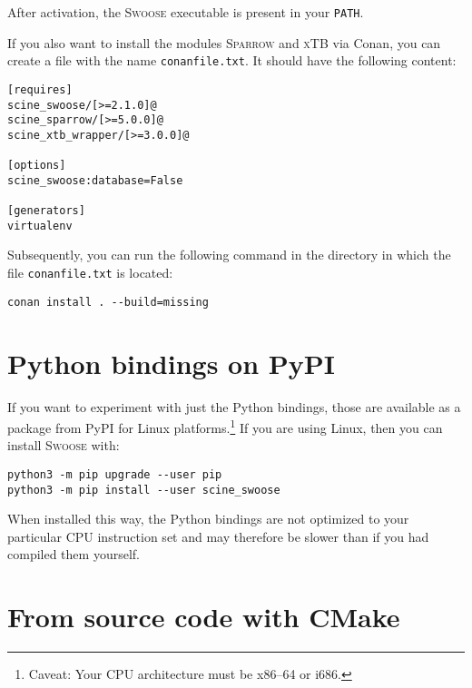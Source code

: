 \documentclass[]{tufte-book}
\begin{document}
After activation, the \textsc{Swoose} executable is present in your \texttt{PATH}.

If you also want to install the modules \textsc{Sparrow} and \textsc{xTB} via Conan, you can create a file with the name \texttt{conanfile.txt}. It should have the following content:

\begin{mdframed}[backgroundcolor=LightSteelBlue!25, linewidth=0pt]
\begin{verbatim}
[requires]
scine_swoose/[>=2.1.0]@
scine_sparrow/[>=5.0.0]@
scine_xtb_wrapper/[>=3.0.0]@

[options]
scine_swoose:database=False

[generators]
virtualenv
\end{verbatim}
\end{mdframed}

Subsequently, you can run the following command in the directory in which the file \texttt{conanfile.txt} is located:
\begin{mdframed}[backgroundcolor=LightSteelBlue!25, linewidth=0pt]
\begin{verbatim}
conan install . --build=missing
\end{verbatim}
\end{mdframed}

\section{Python bindings on PyPI}
If you want to experiment with just the Python bindings, those are available as
a package from PyPI for Linux platforms.\footnote{Caveat: Your CPU architecture
must be x86--64 or i686.} If you are using Linux, then you can install
\textsc{Swoose} with:

\begin{mdframed}[backgroundcolor=LightSteelBlue!25, linewidth=0pt]
\begin{verbatim}
python3 -m pip upgrade --user pip
python3 -m pip install --user scine_swoose
\end{verbatim}
\end{mdframed}

When installed this way, the Python bindings are not optimized to your
particular CPU instruction set and may therefore be slower than if you had
compiled them yourself.

\section{From source code with CMake}
\end{document}
